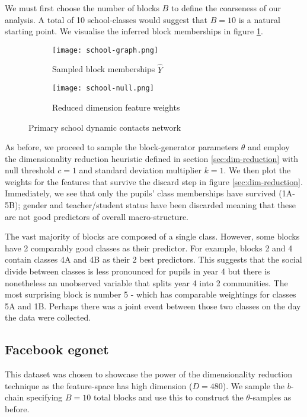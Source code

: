 We must first choose the number of blocks $B$ to define the coarseness of our analysis. A total of 10 school-classes would suggest that $B=10$ is a natural starting point. We visualise the inferred block memberships in figure \ref{fig:school-graph}.
%
\begin{figure}[!h]
	\centering
	\begin{subfigure}{0.45\linewidth}
		\centering
		\texttt{[image: school-graph.png]}
		\caption{Sampled block memberships $\hat{Y}$}
		\label{fig:school-graph}
	\end{subfigure}
	\hfill
	\begin{subfigure}{0.45\linewidth}
		\centering
		\texttt{[image: school-null.png]}
		\caption{Reduced dimension feature weights}
		\label{fig:school-null}
	\end{subfigure}
	\caption{Primary school dynamic contacts network \cite{schools}}
\end{figure}

As before, we proceed to sample the block-generator parameters $\theta$ and employ the dimensionality reduction heuristic defined in section \ref{sec:dim-reduction} with null threshold $c=1$ and standard deviation multiplier $k=1$. We then plot the weights for the features that survive the discard step in figure \ref{sec:dim-reduction}. Immediately, we see that only the pupils' class memberships have survived (1A-5B); gender and teacher/student status have been discarded meaning that these are not good predictors of overall macro-structure.

The vast majority of blocks are composed of a single class. However, some blocks have 2 comparably good classes as their predictor. For example, blocks 2 and 4 contain classes 4A and 4B as their 2 best predictors. This suggests that the social divide between classes is less pronounced for pupils in year 4 but there is nonetheless an unobserved variable that splits year 4 into 2 communities. The most surprising block is number 5 - which has comparable weightings for classes 5A and 1B. Perhaps there was a joint event between those two classes on the day the data were collected.

\subsection{Facebook egonet}

This dataset was chosen to showcase the power of the dimensionality reduction technique as the feature-space has high dimension ($D=480$). We sample the $b$-chain specifying $B=10$ total blocks and use this to construct the $\theta$-samples as before. 

